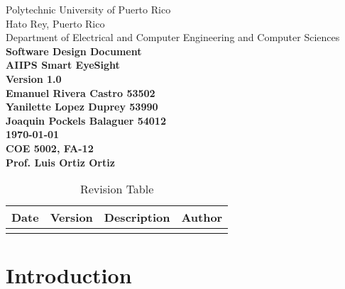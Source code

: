 \documentclass[12pt]{article}
\begin{document}
\begin{titlepage}
 \centering
 Polytechnic University of Puerto Rico\\
 Hato Rey, Puerto Rico\\
 Department of Electrical and Computer Engineering and Computer Sciences\\
    \vspace*{15\baselineskip}
    \large
    \bfseries
    Software Design Document \\
    AIIPS Smart EyeSight\\
    Version 1.0\\[3\baselineskip]
    \normalfont
     \vfill
    Emanuel Rivera Castro 53502 \\
    Yanilette Lopez Duprey 53990\\
    Joaquin Pockels Balaguer 54012\\[2\baselineskip]

    \textbf{\today} \\
    COE 5002, FA-12\\
    Prof. Luis Ortiz Ortiz\\[2\baselineskip]
\end{titlepage}

\begin{table}[H]\centering
\begin{tabular}{|c|c|c|c|}
  \hline
  Date & Version & Description & Author \\
   \hline
    & &  &  \\
   \hline
\end{tabular}
\caption{Revision Table}
\end{table}
\pagebreak
\tableofcontents
\pagebreak
\listoftables
\pagebreak
\listoffigures
\clearpage{}

\section{Introduction}
\end{document}
